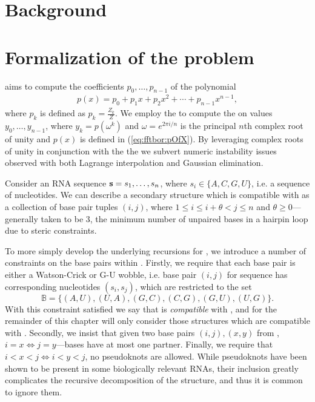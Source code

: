 \section{Background}
\label{sec:fftbor:bkgrnd}

\section{Formalization of the problem}
\label{sec:fftbor:formal}

\fftbor aims to compute the coefficients $p_0,\ldots,p_{n-1}$ of the polynomial
\begin{align}
\label{eq:fftbor:pOfX}
p(x) = p_0 + p_1 x + p_2 x^2 + \cdots + p_{n-1} x^{n-1},
\end{align}
where $p_k$ is defined as $p_k = \frac{Z_k}{Z}$. We employ the \fft to compute
the \idft on values $y_0,\ldots,y_{n-1}$, where
$y_k = p(\omega^k)$ and $\omega = e^{2 \pi i/n}$ is the principal $n$th complex
root of unity and $p(x)$ is defined in (\ref{eq:fftbor:pOfX}). By leveraging
complex
roots of unity in conjunction with the \idft the we subvert numeric instability
issues observed with both Lagrange interpolation and Gaussian elimination.

Consider an RNA sequence ${\bf s} = s_1,\ldots,s_n$, where
$s_i \in \{A,C,G,U\}$, i.e. a sequence of nucleotides. We can describe a
secondary structure \str which is compatible with \seq as a collection of
base pair tuples $(i,j)$, where $1 \le i \le i+\theta < j \le n$ and
$\theta \ge 0$---generally taken to be 3, the minimum number of unpaired bases
in a hairpin loop due to steric constraints.

To more simply develop the underlying recursions for \fftbor, we introduce a
number of constraints on the base pairs within \str. Firstly, we require that
each base pair is either a Watson-Crick or G-U wobble, i.e. base pair $(i,j)$
for sequence \seq has corresponding nucleotides $(s_i,s_j)$, which are
restricted to the set
\[
\mathbb{B} = \{(A,U), (U,A), (G,C), (C,G), (G,U), (U,G)\}.
\]
With
this constraint satisfied we say that \str is {\em compatible} with \seq, and
for the remainder of this chapter will only consider those structures which are
compatible with \seq.
Secondly, we insist that given two base pairs $(i,j), (x,y)$ from \str,
$i=x \iff j=y$---bases have at most one partner. Finally, we require that
$i<x<j \iff i<y<j$, no pseudoknots are allowed. While pseudoknots have been
shown to be present in some biologically relevant RNAs, their inclusion greatly
complicates the recursive decomposition of the structure, and thus it is common
to ignore them.

